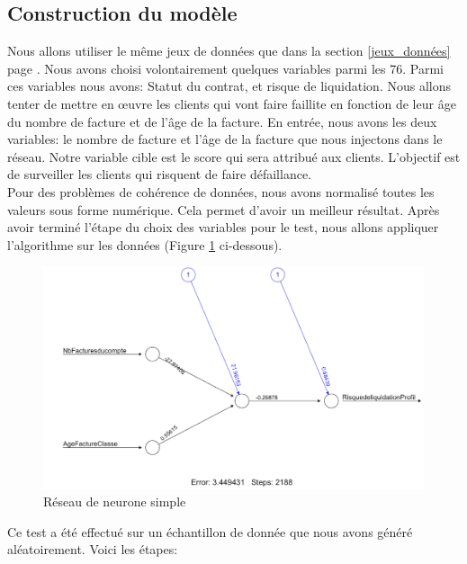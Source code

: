\documentclass[11pt,a4paper]{report}
\begin{document}
\subsection{Construction du modèle} \label{page}
Nous allons utiliser le même jeux de données que dans la section \ref{jeux_données} page \pageref{jeux_données}. Nous avons choisi volontairement quelques variables parmi les 76. Parmi ces variables nous avons: Statut du contrat, et risque de liquidation. Nous allons tenter de mettre en œuvre les clients qui vont faire faillite en fonction de leur âge du nombre de facture et de l'âge de la facture. 
En entrée, nous avons les deux variables: le nombre de facture et l'âge de la facture que nous injectons dans le réseau. Notre variable cible est le score qui sera attribué aux clients. L'objectif est de surveiller les clients qui risquent de faire défaillance.\\
Pour des problèmes de cohérence de données, nous avons normalisé toutes les valeurs sous forme numérique. Cela permet d'avoir un meilleur résultat.   
Après avoir terminé l'étape du choix des variables pour le test, nous allons appliquer l'algorithme sur les données (Figure \ref{figure18} ci-dessous).
\newpage


    \begin{figure}[h]
%
%
%
   
   \includegraphics[scale=0.45]{neural1.png}
     \caption{Réseau de neurone simple}
     \label{figure18}
\end{figure}
Ce test a été effectué sur un échantillon de donnée que nous avons généré aléatoirement. Voici les étapes: 
\end{document}
